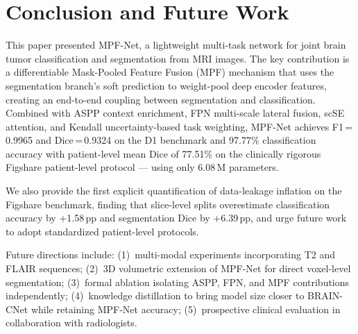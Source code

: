 \documentclass[journal]{IEEEtran}
\begin{document}
\section{Conclusion and Future Work}
\label{sec:conclusion}

This paper presented MPF-Net, a lightweight multi-task network for joint
brain tumor classification and segmentation from MRI images. The key
contribution is a differentiable Mask-Pooled Feature Fusion (MPF) mechanism
that uses the segmentation branch's soft prediction to weight-pool deep encoder
features, creating an end-to-end coupling between segmentation and classification.
Combined with ASPP context enrichment, FPN multi-scale lateral fusion, scSE
attention, and Kendall uncertainty-based task weighting, MPF-Net achieves
F1\,=\,0.9965 and Dice\,=\,0.9324 on the D1 benchmark and 97.77\% classification
accuracy with patient-level mean Dice of 77.51\% on the clinically rigorous
Figshare patient-level protocol — using only 6.08\,M parameters.

We also provide the first explicit quantification of data-leakage inflation
on the Figshare benchmark, finding that slice-level splits overestimate
classification accuracy by +1.58\,pp and segmentation Dice by +6.39\,pp,
and urge future work to adopt standardized patient-level protocols.

Future directions include: (1)~multi-modal experiments incorporating T2 and
FLAIR sequences; (2)~3D volumetric extension of MPF-Net for direct voxel-level
segmentation; (3)~formal ablation isolating ASPP, FPN, and MPF contributions
independently; (4)~knowledge distillation to bring model size closer to
BRAIN-CNet while retaining MPF-Net accuracy; (5)~prospective clinical evaluation
in collaboration with radiologists.



\end{document}
